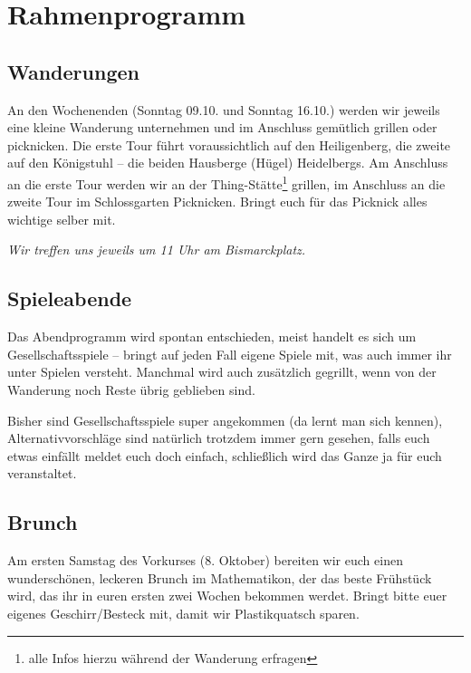 \section{Rahmenprogramm}
\subsection{Wanderungen}
An den Wochenenden (Sonntag 09.10. und Sonntag 16.10.) werden wir jeweils eine kleine Wanderung unternehmen und im Anschluss gemütlich grillen oder picknicken. Die erste Tour führt voraussichtlich auf den Heiligenberg, die zweite auf den Königstuhl -- die beiden Hausberge (Hügel) Heidelbergs. Am Anschluss an die erste Tour werden wir an der Thing-Stätte\footnote{alle Infos hierzu während der Wanderung erfragen} grillen, im Anschluss an die zweite Tour im Schlossgarten Picknicken. Bringt euch für das Picknick alles wichtige selber mit.

\noindent\emph{Wir treffen uns jeweils um 11 Uhr am Bismarckplatz.}

\subsection{Spieleabende}
Das Abendprogramm wird spontan entschieden, meist handelt es sich um Gesellschaftsspiele -- bringt auf jeden Fall eigene Spiele mit, was auch immer ihr unter Spielen versteht. Manchmal wird auch zusätzlich gegrillt, wenn von der Wanderung noch Reste übrig geblieben sind.

Bisher sind Gesellschaftsspiele super angekommen (da lernt man sich kennen), Alternativvorschläge sind natürlich trotzdem immer gern gesehen, falls euch etwas einfällt meldet euch doch einfach, schließlich wird das Ganze ja für euch veranstaltet.

\subsection{Brunch}
Am ersten Samstag des Vorkurses (8. Oktober) bereiten wir euch einen wunderschönen, leckeren Brunch im \gls{Mathematikon}, der das beste Frühstück wird, das ihr in euren ersten zwei Wochen bekommen werdet. Bringt bitte euer eigenes Geschirr/Besteck mit, damit wir Plastikquatsch sparen.


